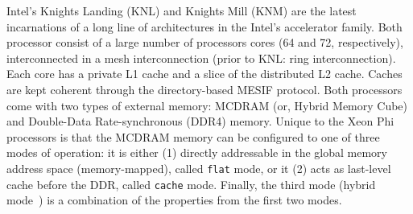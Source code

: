 \begin{comment}
\begin{figure}[tbp]
    \centering
    \texttt{[image: KNLvsKNM]}
    \caption{\label{fig:knlvsknm}Comparison of KNL and KNM architecture\cJD{Is this figure necessary? Isn't Table 1 enough?}}
\end{figure}
\end{comment}

Intel's Knights Landing (KNL) and Knights Mill (KNM) are the latest incarnations of a long line of architectures in the Intel's accelerator family. Both processor consist of a large number of processors cores (64 and 72, respectively), interconnected in a mesh interconnection (prior to KNL: ring interconnection). Each core has a private L1 cache and a slice of the distributed L2 cache. Caches are kept coherent through the directory-based MESIF protocol.
Both processors come with two types of external memory: MCDRAM (or, Hybrid Memory Cube) and Double-Data Rate-synchronous (DDR4) memory. Unique to the Xeon Phi processors is that the MCDRAM memory can be configured to one of three modes of operation: it is either (1) directly addressable in the global memory address space (memory-mapped), called \texttt{flat} mode, or it (2) acts as last-level cache before the DDR, called \texttt{cache} mode. Finally, the third mode (hybrid mode~\cite{heinecke_high_2016}) is a combination of the properties from the first two modes.

